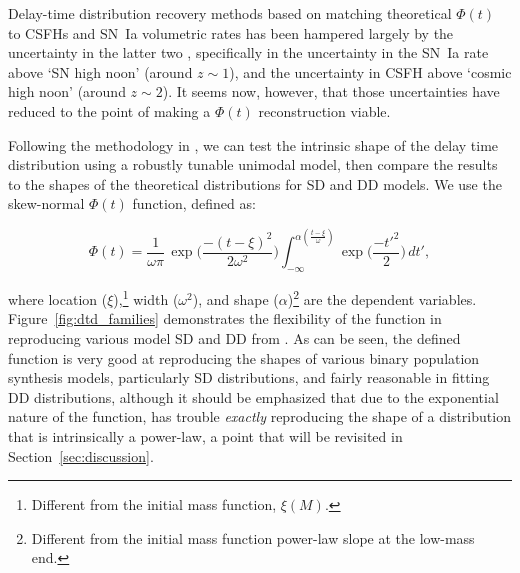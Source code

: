 \documentclass[apj]{aastex62}
\begin{document}
Delay-time distribution recovery methods based on matching theoretical $\Phi(t)$ to CSFHs and SN~Ia volumetric rates has been hampered largely by the uncertainty in the latter two \citep{Dahlen:2008,Strolger:2010,Graur:2014,Rodney:2014fj}, specifically in the uncertainty in the SN~Ia rate above `SN high noon' (around $z\sim1$), and the uncertainty in CSFH above `cosmic high noon' (around $z\sim2$). It seems now, however, that those uncertainties have reduced to the point of making a $\Phi(t)$ reconstruction viable.


Following the methodology in \cite{Strolger:2010}, we can test the intrinsic shape of the delay time distribution using a robustly tunable unimodal model, then compare the results to the shapes of the theoretical distributions for SD and DD models. We use the skew-normal $\Phi(t)$ function, defined as:

\begin{equation}
	\Phi(t)=\frac{1}{\omega\pi}\,\exp\biggl(\frac{-(t-\xi)^2}{2\omega^2}\biggr)\int_{-\infty}^{\alpha (\frac{t-\xi}{\omega})} \exp\biggl(\frac{-t'^2}{2}\biggr)\,dt',
\label{eqn:model}
\end{equation}

\noindent where location ($\xi$),\footnote{Different from the initial mass function, $\xi(M)$.} width ($\omega^2$), and shape ($\alpha$)\footnote{Different from the initial mass function power-law slope at the low-mass end.} are the dependent variables. Figure~\ref{fig:dtd_families} demonstrates the flexibility of the function in reproducing various model SD and DD from \cite{Nelemans:2013}. As can be seen, the defined function is very good at reproducing the shapes of various binary population synthesis models, particularly SD distributions, and fairly reasonable in fitting DD distributions, although it should be emphasized that due to the exponential nature of the function, has trouble \textit{exactly} reproducing the shape of a distribution that is intrinsically a power-law, a point that will be revisited in Section~\ref{sec:discussion}.
\end{document}
